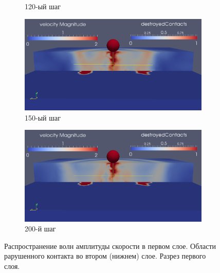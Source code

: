 \begin{figure}[H]
\begin{subfigure}[b]{0.5\textwidth}
\caption{120-ый шаг}
\end{subfigure}
\begin{subfigure}[b]{0.5\textwidth}
\centering
\includegraphics[width=1.0\textwidth]{png/delamination/single_clip/150.png}
\caption{150-ый шаг}
\end{subfigure}
\begin{subfigure}[b]{0.5\textwidth}
\centering
\includegraphics[width=1.0\textwidth]{png/delamination/single_clip/200.png}
\caption{200-й шаг}
\end{subfigure}
\caption{Распространение волн амплитуды скорости в первом слое. Области рарушенного контакта во втором (нижнем) слое. Разрез первого слоя.}
\label{pic:delamination_single_clip}
\end{figure}

